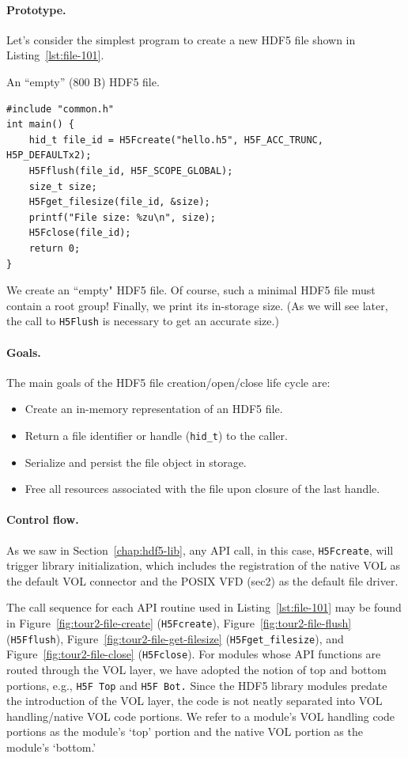 \paragraph{Prototype.} Let's consider the simplest program to create a new HDF5 file shown in Listing~\ref{lst:file-101}.

\begin{listing}
\centering
\caption{An ``empty'' (800 B) HDF5 file.}
\label{lst:file-101}
\begin{verbatim}
#include "common.h"
int main() {
    hid_t file_id = H5Fcreate("hello.h5", H5F_ACC_TRUNC, H5P_DEFAULTx2);
    H5Fflush(file_id, H5F_SCOPE_GLOBAL);
    size_t size;
    H5Fget_filesize(file_id, &size);
    printf("File size: %zu\n", size);
    H5Fclose(file_id);
    return 0;
}
\end{verbatim}
\end{listing}

We create an ``empty" HDF5 file. Of course, such a minimal HDF5 file must contain a root group! Finally, we print its in-storage size. (As we will see later, the call to \texttt{H5Flush} is necessary to get an accurate size.)

\paragraph{Goals.} The main goals of the HDF5 file creation/open/close life cycle are:
\begin{itemize}
    \item Create an in-memory representation of an HDF5 file.
    \item Return a file identifier or handle (\texttt{hid\_t}) to the caller.
    \item Serialize and persist the file object in storage.
    \item Free all resources associated with the file upon closure of the last handle.
\end{itemize}

\paragraph{Control flow.} As we saw in Section~\ref{chap:hdf5-lib}, any API call, in this case, \texttt{H5Fcreate}, will trigger library initialization, which includes the registration of the native VOL as the default VOL connector and the POSIX VFD (sec2) as the default file driver. 

The call sequence for each API routine used in Listing~\ref{lst:file-101} may be found in Figure~\ref{fig:tour2-file-create} (\texttt{H5Fcreate}), Figure~\ref{fig:tour2-file-flush} (\texttt{H5Fflush}), Figure~\ref{fig:tour2-file-get-filesize} (\texttt{H5Fget\_filesize}), and Figure~\ref{fig:tour2-file-close} (\texttt{H5Fclose}). For modules whose API functions are routed through the VOL layer, we have adopted the notion of top and bottom portions, e.g., \texttt{H5F Top} and \texttt{H5F Bot.} Since the HDF5 library modules predate the introduction of the VOL layer, the code is not neatly separated into VOL handling/native VOL code portions. We refer to a module's VOL handling code portions as the module's `top' portion and the native VOL portion as the module's `bottom.'


